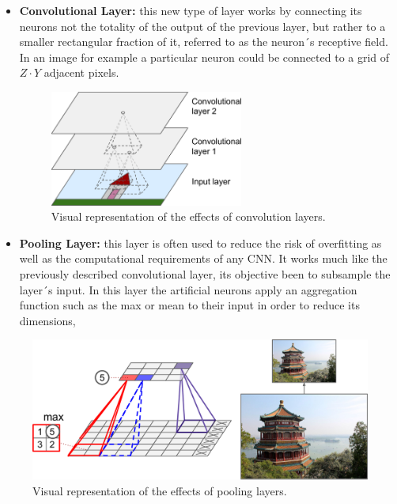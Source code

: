 \documentclass[12pt, a4paper]{article}
\begin{document}
	\begin{itemize}
		
		\item \textbf{Convolutional Layer:} this new type of layer works by connecting its neurons not the totality of the output of the previous layer, but rather to a smaller rectangular fraction of it, referred to as the neuron´s receptive field. In an image for example a particular neuron could be connected to a grid of $Z \cdot Y$ adjacent pixels. 
		
		\begin{figure}[H]
			\centering
			\label{ConvLayer}
			\includegraphics[height=38mm]{img/convLayer.png}
			\caption{Visual representation of the effects of convolution layers.\cite{handsonmachinelearning}}
		\end{figure}
		
		\item \textbf{Pooling Layer:} this layer is often used to reduce the risk of overfitting as well as the computational requirements of any CNN. It works much like the previously described convolutional layer, its objective been to subsample the layer´s input. In this layer the artificial neurons apply an aggregation function such as the max or mean to their input in order to reduce its dimensions,
		
	\end{itemize}
	
	\begin{figure}[H]
		\centering
		\label{MaxPoolLayer}
		\includegraphics{img/maxPoolingLayer.png}
		\caption{Visual representation of the effects of pooling layers. \cite{handsonmachinelearning}}
	\end{figure}
\end{document}

